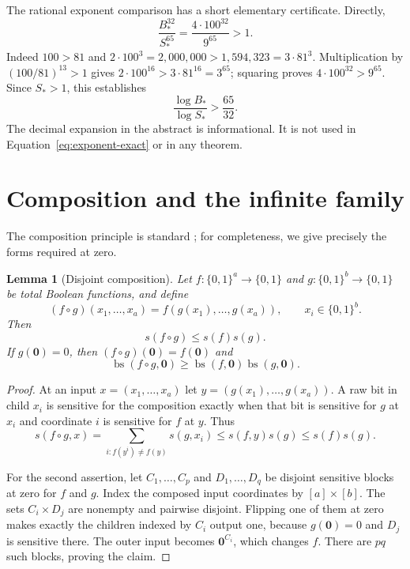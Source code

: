 \documentclass[11pt]{article}
\newtheorem{lemma}[theorem]{Lemma}
\theoremstyle{definition}
\theoremstyle{remark}
\DeclareMathOperator{\bs}{bs}
\newcommand{\sens}{s}
\newcommand{\bits}{\{0,1\}}
\newcommand{\zero}{\mathbf{0}}
\begin{document}
The rational exponent comparison has a short elementary certificate.
Directly,
\[
 \frac{B_*^{32}}{S_*^{65}}
 =\frac{4\cdot100^{32}}{9^{65}}>1.
\]
Indeed $100>81$ and
$2\cdot100^3=2{,}000{,}000>1{,}594{,}323=3\cdot81^3$.
Multiplication by $(100/81)^{13}>1$ gives
$2\cdot100^{16}>3\cdot81^{16}=3^{65}$; squaring proves
$4\cdot100^{32}>9^{65}$.  Since $S_*>1$, this establishes
\begin{equation}
                    \frac{\log B_*}{\log S_*}>\frac{65}{32}.
 \label{eq:exponent-exact}
\end{equation}
The decimal expansion in the abstract is informational.  It is not
used in Equation~\eqref{eq:exponent-exact} or in any theorem.

\section{Composition and the infinite family}
\label{sec:composition}

The composition principle is standard \cite{Tal2013}; for completeness,
we give precisely the forms required at zero.

\begin{lemma}[Disjoint composition]
\label{lem:composition}
Let $f:\bits^a\to\bits$ and $g:\bits^b\to\bits$ be total Boolean
functions, and define
\[
 (f\circ g)(x_1,\ldots,x_a)
          =f(g(x_1),\ldots,g(x_a)),\qquad x_i\in\bits^b.
\]
Then
\[
                     \sens(f\circ g)\le\sens(f)\sens(g).
\]
If $g(\zero)=0$, then $(f\circ g)(\zero)=f(\zero)$ and
\[
                  \bs(f\circ g,\zero)
                  \ge\bs(f,\zero)\bs(g,\zero).
\]
\end{lemma}

\begin{proof}
At an input $x=(x_1,\ldots,x_a)$ let
$y=(g(x_1),\ldots,g(x_a))$.  A raw bit in child $x_i$ is sensitive
for the composition exactly when that bit is sensitive for $g$ at
$x_i$ and coordinate $i$ is sensitive for $f$ at $y$.  Thus
\[
 \sens(f\circ g,x)
    =\sum_{i:f(y^i)\ne f(y)}\sens(g,x_i)
    \le\sens(f,y)\sens(g)
    \le\sens(f)\sens(g).
\]

For the second assertion, let $C_1,\ldots,C_p$ and
$D_1,\ldots,D_q$ be disjoint sensitive blocks at zero for $f$ and
$g$.  Index the composed input coordinates by $[a]\times[b]$.
The sets $C_i\times D_j$ are nonempty and pairwise disjoint.  Flipping
one of them at zero makes exactly the children indexed by $C_i$
output one, because $g(\zero)=0$ and $D_j$ is sensitive there.  The
outer input becomes $\zero^{C_i}$, which changes $f$.  There are
$pq$ such blocks, proving the claim.
\end{proof}
\end{document}
